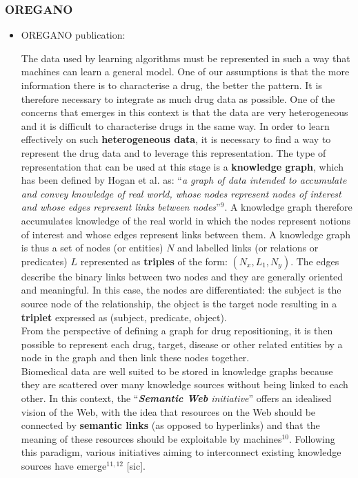 \documentclass{article}
\begin{document}
\subsubsection{OREGANO}

\begin{itemize}

\item OREGANO publication:
\begin{displayquote}
The data used by learning algorithms must be represented in such a way that machines can learn a general model. One of our assumptions is that the more information there is to characterise a drug, the better the pattern. It is therefore necessary to integrate as much drug data as possible. One of the concerns that emerges in this context is that the data are very heterogeneous and it is difficult to characterise drugs in the same way. In order to learn effectively on such \textbf{heterogeneous data}, it is necessary to find a way to represent the drug data and to leverage this representation. The type of representation that can be used at this stage is a \textbf{knowledge graph}, which has been defined by Hogan et al. as: “\textit{a graph of data intended to accumulate and convey knowledge of real world, whose nodes represent nodes of interest and whose edges represent links between nodes}”$^9$. A knowledge graph therefore accumulates knowledge of the real world in which the nodes represent notions of interest and whose edges represent links between them. A knowledge graph is thus a set of nodes (or entities) $ N $ and labelled links (or relations or predicates) $ L $ represented as \textbf{triples} of the form: $ (N_x, L_1, N_y) $. The edges describe the binary links between two nodes and they are generally oriented and meaningful. In this case, the nodes are differentiated: the subject is the source node of the relationship, the object is the target node resulting in a \textbf{triplet} expressed as (subject, predicate, object).\\
From the perspective of defining a graph for drug repositioning, it is then possible to represent each drug, target, disease or other related entities by a node in the graph and then link these nodes together.\\
Biomedical data are well suited to be stored in knowledge graphs because they are scattered over many knowledge sources without being linked to each other. In this context, the “\textit{\textbf{Semantic Web} initiative}” offers an idealised vision of the Web, with the idea that resources on the Web should be connected by \textbf{semantic links} (as opposed to hyperlinks) and that the meaning of these resources should be exploitable by machines$^{10}$. Following this paradigm, various initiatives aiming to interconnect existing knowledge sources have emerge$^{11,12}$ [sic].
\end{displayquote}



\end{itemize}
\end{document}
